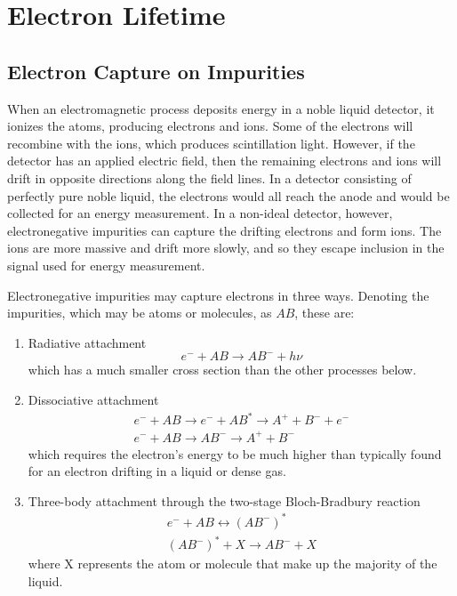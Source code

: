 \documentclass[herrin-thesis.tex]{subfiles}
\begin{document}
\chapter{Electron Lifetime}
\label{ch:electronlifetime}

\section{Electron Capture on Impurities}
When an electromagnetic process deposits energy in a noble liquid detector, it ionizes the atoms, producing electrons and ions. Some of the electrons will recombine with the ions, which produces scintillation light. However, if the detector has an applied electric field, then the remaining electrons and ions will drift in opposite directions along the field lines. In a detector consisting of perfectly pure noble liquid, the electrons would all reach the anode and would be collected for an energy measurement. In a non-ideal detector, however, electronegative impurities can capture the drifting electrons and form ions. The ions are more massive and drift more slowly, and so they escape inclusion in the signal used for energy measurement.

Electronegative impurities may capture electrons in three ways\cite{Aprile:2006fk}. Denoting the impurities, which may be atoms or molecules, as \(AB\), these are:
\begin{enumerate}
\item Radiative attachment
\begin{equation}
e^{-} + AB \rightarrow AB^{-} + h \nu
\end{equation}
which has a much smaller cross section than the other processes below.
\item Dissociative attachment
\begin{equation}
\begin{split}
e^{-} + AB \rightarrow e^{-} + AB^{*} \rightarrow A^{+} + B^{-} + e^{-} \\
e^{-} + AB \rightarrow AB^{-} \rightarrow A^{+} + B^{-}
\end{split}
\end{equation}
which requires the electron's energy to be much higher than typically found for an electron drifting in a liquid or dense gas.
\item Three-body attachment through the two-stage Bloch-Bradbury reaction
\begin{equation}
\begin{split}
e^{-} + AB \leftrightarrow (AB^{-})^{*} \\
(AB^{-})^{*} + X \rightarrow AB^{-} + X
\end{split}
\label{eq:el_3bodyattachment}
\end{equation}
where X represents the atom or molecule that make up the majority of the liquid.
\end{enumerate}
\end{document}
